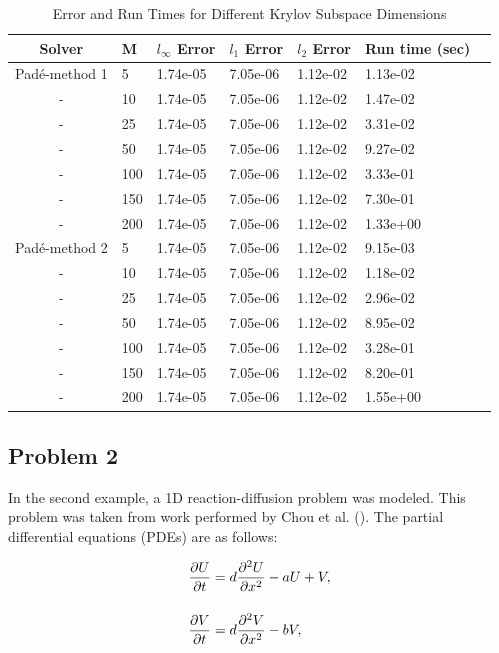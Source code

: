\clearpage

\begin{table}[p]
   \caption{\label{tab:diffusion_problem1_results_krylov} Error and Run Times for Different Krylov Subspace Dimensions}
   \centering
   \begin{tabular}{cllllll}
   \hline
   Solver & M & $l_{\infty}$ Error & $l_{1}$ Error & $l_{2}$ Error & Run time (sec)\\
   \hline
   Pad\'e-method 1 &   5 & 1.74e-05 & 7.05e-06 & 1.12e-02 & 1.13e-02 \\
   - &  10 & 1.74e-05 & 7.05e-06 & 1.12e-02 & 1.47e-02 \\
   - &  25 & 1.74e-05 & 7.05e-06 & 1.12e-02 & 3.31e-02 \\
   - &  50 & 1.74e-05 & 7.05e-06 & 1.12e-02 & 9.27e-02 \\
   - & 100 & 1.74e-05 & 7.05e-06 & 1.12e-02 & 3.33e-01 \\
   - & 150 & 1.74e-05 & 7.05e-06 & 1.12e-02 & 7.30e-01 \\
   - & 200 & 1.74e-05 & 7.05e-06 & 1.12e-02 & 1.33e+00 \\
   \hline
   Pad\'e-method 2 &   5 & 1.74e-05 & 7.05e-06 & 1.12e-02 & 9.15e-03 \\
   - &  10 & 1.74e-05 & 7.05e-06 & 1.12e-02 & 1.18e-02 \\
   - &  25 & 1.74e-05 & 7.05e-06 & 1.12e-02 & 2.96e-02 \\
   - &  50 & 1.74e-05 & 7.05e-06 & 1.12e-02 & 8.95e-02 \\
   - & 100 & 1.74e-05 & 7.05e-06 & 1.12e-02 & 3.28e-01 \\
   - & 150 & 1.74e-05 & 7.05e-06 & 1.12e-02 & 8.20e-01 \\
   - & 200 & 1.74e-05 & 7.05e-06 & 1.12e-02 & 1.55e+00 \\
   \hline
   \end{tabular}
\end{table}


\FloatBarrier
\clearpage

\subsection{Problem 2}
In the second example, a 1D reaction-diffusion problem was modeled. This problem was taken from work performed by Chou et al. (\cite{ching2007}). The partial differential equations (PDEs) are as follows:

\begin{equation}
\setlength{\jot}{15pt}
\begin{split}
    \frac{\partial U}{\partial t} &= d\frac{\partial^{2}U}{\partial x^{2}} - aU + V, \\
    \frac{\partial V}{\partial t} &=
    d\frac{\partial^{2}V}{\partial x^{2}} - bV,
\end{split}
    \label{eq:problem2Eqs}
\end{equation}

